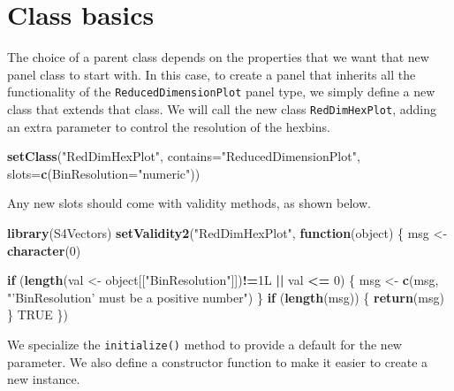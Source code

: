 \documentclass[
]{book}
\newenvironment{Shaded}{\begin{snugshade}}{\end{snugshade}}
\newcommand{\ControlFlowTok}[1]{\textcolor[rgb]{0.13,0.29,0.53}{\textbf{#1}}}
\newcommand{\DataTypeTok}[1]{\textcolor[rgb]{0.13,0.29,0.53}{#1}}
\newcommand{\DecValTok}[1]{\textcolor[rgb]{0.00,0.00,0.81}{#1}}
\newcommand{\KeywordTok}[1]{\textcolor[rgb]{0.13,0.29,0.53}{\textbf{#1}}}
\newcommand{\NormalTok}[1]{#1}
\newcommand{\OperatorTok}[1]{\textcolor[rgb]{0.81,0.36,0.00}{\textbf{#1}}}
\newcommand{\OtherTok}[1]{\textcolor[rgb]{0.56,0.35,0.01}{#1}}
\newcommand{\StringTok}[1]{\textcolor[rgb]{0.31,0.60,0.02}{#1}}
\begin{document}
\hypertarget{class-basics}{%
\section{Class basics}\label{class-basics}}

The choice of a parent class depends on the properties that we want that new panel class to start with.
In this case, to create a panel that inherits all the functionality of the \texttt{ReducedDimensionPlot} panel type, we simply define a new class that extends that class.
We will call the new class \texttt{RedDimHexPlot}, adding an extra parameter to control the resolution of the hexbins.

\begin{Shaded}
\begin{Highlighting}[]
\KeywordTok{setClass}\NormalTok{(}\StringTok{"RedDimHexPlot"}\NormalTok{, }\DataTypeTok{contains=}\StringTok{"ReducedDimensionPlot"}\NormalTok{, }
    \DataTypeTok{slots=}\KeywordTok{c}\NormalTok{(}\DataTypeTok{BinResolution=}\StringTok{"numeric"}\NormalTok{))}
\end{Highlighting}
\end{Shaded}

Any new slots should come with validity methods, as shown below.

\begin{Shaded}
\begin{Highlighting}[]
\KeywordTok{library}\NormalTok{(S4Vectors)}
\KeywordTok{setValidity2}\NormalTok{(}\StringTok{"RedDimHexPlot"}\NormalTok{, }\ControlFlowTok{function}\NormalTok{(object) \{}
\NormalTok{    msg <-}\StringTok{ }\KeywordTok{character}\NormalTok{(}\DecValTok{0}\NormalTok{)}

    \ControlFlowTok{if}\NormalTok{ (}\KeywordTok{length}\NormalTok{(val <-}\StringTok{ }\NormalTok{object[[}\StringTok{"BinResolution"}\NormalTok{]])}\OperatorTok{!=}\NormalTok{1L }\OperatorTok{||}\StringTok{ }\NormalTok{val }\OperatorTok{<=}\StringTok{ }\DecValTok{0}\NormalTok{) \{}
\NormalTok{        msg <-}\StringTok{ }\KeywordTok{c}\NormalTok{(msg, }\StringTok{"'BinResolution' must be a positive number"}\NormalTok{)}
\NormalTok{    \}}
    \ControlFlowTok{if}\NormalTok{ (}\KeywordTok{length}\NormalTok{(msg)) \{}
        \KeywordTok{return}\NormalTok{(msg)}
\NormalTok{    \}}
    \OtherTok{TRUE}
\NormalTok{\})}
\end{Highlighting}
\end{Shaded}

We specialize the \texttt{initialize()} method to provide a default for the new parameter.
We also define a constructor function to make it easier to create a new instance.
\end{document}
